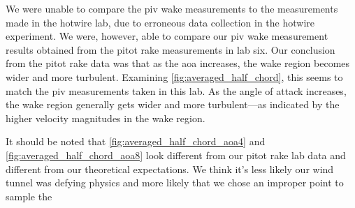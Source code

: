 We were unable to compare the \acrshort{piv} wake measurements to the measurements made in the hotwire lab, due to erroneous data collection in the hotwire experiment. We were, however, able to compare our \acrshort{piv} wake measurement results obtained from the pitot rake measurements in lab six. Our conclusion from the pitot rake data was that as the \acrshort{aoa} increases, the wake region becomes wider and more turbulent. Examining \autoref{fig:averaged_half_chord}, this seems to match the \acrshort{piv} measurements taken in this lab. As the angle of attack increases, the wake region generally gets wider and more turbulent—as indicated by the higher velocity magnitudes in the wake region.

It should be noted that \autoref{fig:averaged_half_chord_aoa4} and \autoref{fig:averaged_half_chord_aoa8} look different from our pitot rake lab data and different from our theoretical expectations. We think it's less likely our wind tunnel was defying physics and more likely that we chose an improper point to sample the 